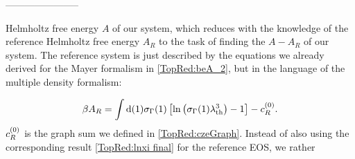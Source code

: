 \documentclass[8.5pt,twoside,twocolumn]{article}
\newcommand\di{\te{d}}
\newcommand\cze{\enmat{c^{(0)}}}
\newcommand\lath{\enmat{\la_\te{th}}}
\newcommand\inon{\enmat{\int\di(1)}}
\theoremstyle{standard}
\begin{document}
-----------------------
 
Helmholtz free energy $A$ of our system,
which reduces with the knowledge of the reference Helmholtz free energy $A_R$ to the task of 
finding the  $A-A_R$ of our system. The reference
system is just described by the equations we already derived for the Mayer formalism in
\eqref{TopRed:beA_2}, but in the language of the multiple density formalism:

\begin{equation}
\be A_R=\inon \siga(1) \ed{\ln\rb{\siga(1)\lath^3} - 1 } - \chs.
\label{TPT:beA_R}
\end{equation} 
$\chs$ is the graph sum we defined in \eqref{TopRed:czeGraph}. Instead of also using
the corresponding result \eqref{TopRed:lnxi final} for the reference EOS, we rather
\end{document}
